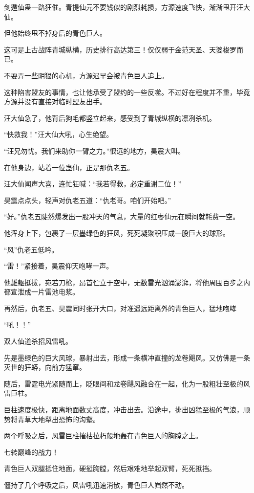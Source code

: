 \begin{this_body}
剑遁仙蛊一路狂催。青提仙元不要钱似的剧烈耗损，方源速度飞快，渐渐甩开汪大仙。

但他始终甩不掉身后的青色巨人。

这可是上古战阵青城纵横，历史排行高达第三！仅仅弱于金范天圣、天婆梭罗而已。

不耍弄一些阴狠的心机，方源迟早会被青色巨人追上。

这种陷害盟友的事情，也让他承受了盟约的一些反噬。不过好在程度并不重，毕竟方源并没有直接对临时盟友出手。

汪大仙急了，他背后狗毛都竖立起来，感受到了青城纵横的凛冽杀机。

“快救我！”汪大仙大吼，心生绝望。

“汪兄勿忧。我们来助你一臂之力。”很远的地方，昊震大叫。

在他身边，站着一位蛊仙，正是那仇老五。

汪大仙闻声大喜，连忙狂喊：“我若得救，必定重谢二位！”

昊震点点头，轻声对仇老五道：“仇老哥。咱们开始吧。”

“好。”仇老五陡然爆发出一股冲天的气息，大量的红枣仙元在瞬间就耗费一空。

他浑身上下，包裹了一层墨绿色的狂风，死死凝聚积压成一股巨大的球形。

“风”仇老五低吟。

“雷！”紧接着，昊震仰天咆哮一声。

他雄躯挺拔，宛若刀枪，昂首伫立于空中，无数雷光汹涌澎湃，将他周围百步之内都宣泄成一片雷池电浆。

再然后，仇老五、昊震同时张开大口，对准遥远距离外的青色巨人，猛地咆哮

“吼！！”

双人仙道杀招风雷吼。

先是墨绿色的巨大风球，暴射出去，形成一条横冲直撞的龙卷飓风。又仿佛是一条灭世的狂蟒，向前方猛窜。

随后，雷霆电光紧随而上，眨眼间和龙卷飓风融合在一起，化为一股粗壮至极的风雷巨柱。

巨柱速度极快，距离地面数丈高度，冲击出去。沿途中，排出凶猛至极的气浪，顺势将青草大地犁出恐怖的沟壑。

两个呼吸之后，风雷巨柱摧枯拉朽般地轰在青色巨人的胸膛之上。

七转巅峰的战力！

青色巨人双腿抵住地面，硬挺胸膛，然后艰难地举起双臂，死死抵挡。

僵持了几个呼吸之后，风雷吼迅速消散，青色巨人岿然不动。


\end{this_body}
